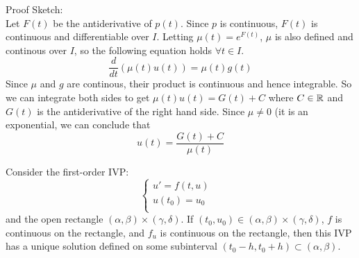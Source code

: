 \documentclass[12pt]{article}
\begin{document}
Proof Sketch: \\
Let $F(t)$ be the antiderivative of $p(t)$. Since $p$ is continuous, $F(t)$ is continuous and differentiable over $I$. Letting $\mu(t) = e^{F(t)}$, $\mu$ is also defined and continous over $I$, so the following equation holds $\forall t \in I$.
$$\frac{d}{dt}(\mu(t)u(t)) = \mu(t)g(t)$$
Since $\mu$ and $g$ are continous, their product is continuous and hence integrable. So we can integrate both sides to get $\mu(t)u(t) = G(t) + C$ where $C \in \mathbb{R}$ and $G(t)$ is the antiderivative of the right hand side. Since $\mu \neq 0$ (it is an exponential, we can conclude that
$$u(t) = \frac{G(t) + C}{\mu(t)}$$

\begin{thm}
	Consider the first-order IVP:
	$$\begin{cases} u'=f(t,u) & \\ u(t_0) = u_0 & \\ \end{cases}$$
	and the open rectangle $(\alpha, \beta) \times (\gamma, \delta)$. If $(t_0, u_0) \in (\alpha, \beta) \times (\gamma, \delta)$, $f$ is continuous on the rectangle, and $f_u$ is continuous on the rectangle, then this IVP has a unique solution defined on some subinterval $(t_0-h, t_0+h) \subset (\alpha, \beta)$.
\end{thm}
\end{document}
